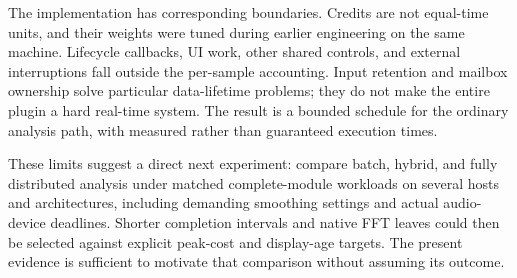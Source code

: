 The implementation has corresponding boundaries. Credits are not equal-time
units, and their weights were tuned during earlier engineering on the same
machine. Lifecycle callbacks, UI work, other shared controls, and external
interruptions fall outside the per-sample accounting. Input retention and
mailbox ownership solve particular data-lifetime problems; they do not make
the entire plugin a hard real-time system. The result is a bounded schedule
for the ordinary analysis path, with measured rather than guaranteed
execution times.

These limits suggest a direct next experiment: compare batch, hybrid, and
fully distributed analysis under matched complete-module workloads on several
hosts and architectures, including demanding smoothing settings and actual
audio-device deadlines. Shorter completion intervals and native FFT leaves
could then be selected against explicit peak-cost and display-age targets.
The present evidence is sufficient to motivate that comparison without
assuming its outcome.

